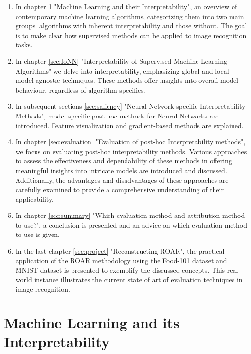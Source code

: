 \begin{enumerate}
	
	\item In chapter \ref{sec:MLandI} "Machine Learning and their Interpretability", an overview of contemporary machine learning algorithms, categorizing them into two main groups: algorithms with inherent interpretability and those without. The goal is to make clear how supervised methods can be applied to image recognition tasks.
	\item In chapter \ref{sec:IoNN} "Interpretability of Supervised Machine Learning Algorithms" we delve into interpretability, emphasizing global and local model-agnostic techniques. These methods offer insights into overall model behaviour, regardless of algorithm specifics. 
	\item In subsequent sections \ref{sec:saliency} "Neural Network specific Interpretability Methods", model-specific post-hoc methods for Neural Networks are introduced. Feature visualization and gradient-based methods are explained.
	\item In chapter \ref{sec:evaluation} "Evaluation of post-hoc Interpretability methods", we focus on evaluating post-hoc interpretability methods. Various approaches to assess the effectiveness and dependability of these methods in offering meaningful insights into intricate models are introduced and discussed. Additionally, the advantages and disadvantages of these approaches are carefully examined to provide a comprehensive understanding of their applicability.
	\item In chapter \ref{sec:summary} "Which evaluation method and attribution method to use?", a conclusion is presented and an advice on which evaluation method to use is given. 
	\item In the last chapter \ref{sec:project} "Reconstructing ROAR", the practical application of the ROAR methodology using the Food-101 dataset \cite{bossard14} and MNIST dataset \cite{deng2012mnist} is presented to exemplify the discussed concepts. This real-world instance illustrates the current state of art of evaluation techniques in image recognition.
\end{enumerate}

\chapter{Machine Learning and its Interpretability}
\label{sec:MLandI}

